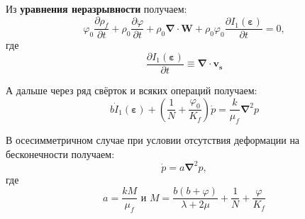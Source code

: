 \documentclass[a4paper,14pt]{extarticle}
\newcommand{\beq}{\begin{equation}}
\newcommand{\eeq}{\end{equation}}
\begin{document}
Из \textbf{уравнения неразрывности} получаем:
\beq
\varphi_0\frac{\partial\rho_{\!f}}{\partial t}+\rho_0\frac{\partial\varphi}{\partial t}+\rho_0\pmb{\nabla}\cdot\pmb{W}+\rho_0\varphi_0\frac{\partial I_1(\pmb{\varepsilon})}{\partial t}=0,
\eeq
где
\beq
\frac{\partial I_1(\pmb{\varepsilon})}{\partial t}\equiv\pmb{\nabla}\cdot\pmb{v_s}
\eeq

А дальше через ряд свёрток и всяких операций получаем:
\beq
b\dot{I}_1(\pmb{\varepsilon})+\left(\frac{1}{N}+\frac{\varphi_0}{K_{\!f}}\right)\dot{p}=\frac{k}{\mu_{\!f}}\pmb{\nabla}^2p
\eeq

В осесимметричном случае при условии отсутствия деформации на бесконечности получаем:
\beq
\dot{p}=a\pmb{\nabla}^2p,
\eeq
где
\beq
a=\frac{kM}{\mu_{\!f}}\text{ и } M=\frac{b\left(b+\varphi\right)}{\lambda+2\mu}+\frac{1}{N}+\frac{\varphi}{K_{\!f}}
\eeq
\end{document}
